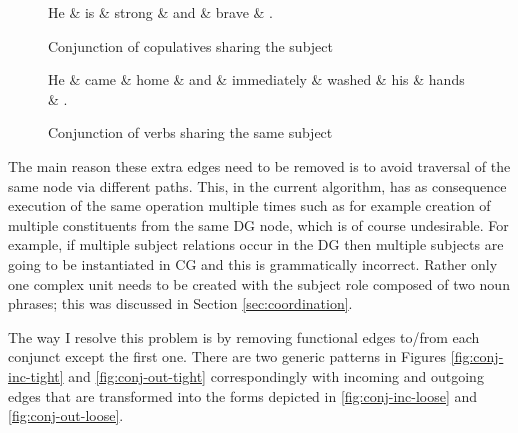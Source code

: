     \begin{figure}[!ht]
    \centering
    	\begin{dependency}
    		\begin{deptext}[]
    	He \& is \& strong \& and \& brave \& . \\
    		\end{deptext}
    	\end{dependency}
    \caption{Conjunction of copulatives sharing the subject}
    \label{fig:conj-copula-subj}
    \end{figure}


    \begin{figure}[!ht]
    \centering
    	\begin{dependency}
    		\begin{deptext}[]
    	He \& came \& home \& and \& immediately \& washed \& his \& hands \& . \\ 
    		\end{deptext}
    	\end{dependency}
    \caption{Conjunction of verbs sharing the same subject}
    \label{fig:conj-verb-subj}
    \end{figure}

    The main reason these extra edges need to be removed is to avoid traversal of the same node via different paths. This, in the current algorithm, has as consequence execution of the same operation multiple times such as for example creation of multiple constituents from the same DG node, which is of course undesirable. For example, if multiple subject relations occur in the DG then multiple subjects are going to be instantiated in CG and this is grammatically incorrect. Rather only one complex unit needs to be created with the subject role composed of two noun phrases; this was discussed in Section \ref{sec:coordination}. 

    The way I resolve this problem is by removing functional edges to/from each conjunct except the first one. There are two generic patterns in Figures \ref{fig:conj-inc-tight} and \ref{fig:conj-out-tight} correspondingly with incoming and outgoing edges that are transformed into the forms depicted in \ref{fig:conj-inc-loose} and \ref{fig:conj-out-loose}. 

